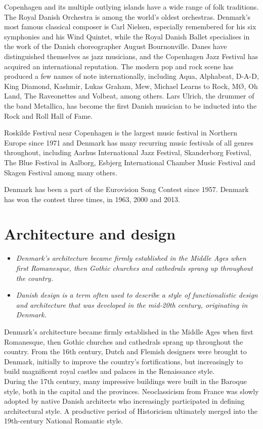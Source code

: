 Copenhagen and its multiple outlying islands have a wide range of folk
traditions. The Royal Danish Orchestra is among the world's oldest
orchestras. Denmark's most famous classical composer is Carl Nielsen,
especially remembered for his six symphonies and his Wind Quintet, while
the Royal Danish Ballet specialises in the work of the Danish
choreographer August Bournonville. Danes have distinguished themselves
as jazz musicians, and the Copenhagen Jazz Festival has acquired an
international reputation. The modern pop and rock scene has produced a
few names of note internationally, including Aqua, Alphabeat, D-A-D,
King Diamond, Kashmir, Lukas Graham, Mew, Michael Learns to Rock, MØ, Oh
Land, The Raveonettes and Volbeat, among others. Lars Ulrich, the
drummer of the band Metallica, has become the first Danish musician to
be inducted into the Rock and Roll Hall of Fame.

Roskilde Festival near Copenhagen is the largest music festival in
Northern Europe since 1971 and Denmark has many recurring music
festivals of all genres throughout, including Aarhus International Jazz
Festival, Skanderborg Festival, The Blue Festival in Aalborg, Esbjerg
International Chamber Music Festival and Skagen Festival among many
others.

Denmark has been a part of the Eurovision Song Contest since 1957.
Denmark has won the contest three times, in 1963, 2000 and 2013.

\section{Architecture and design}\label{architecture-and-design}

\begin{itemize}
\item
  \emph{Denmark's architecture became firmly established in the Middle
  Ages when first Romanesque, then Gothic churches and cathedrals sprang
  up throughout the country.}
\item
  \emph{Danish design is a term often used to describe a style of
  functionalistic design and architecture that was developed in the
  mid-20th century, originating in Denmark.}
\end{itemize}

Denmark's architecture became firmly established in the Middle Ages when
first Romanesque, then Gothic churches and cathedrals sprang up
throughout the country. From the 16th century, Dutch and Flemish
designers were brought to Denmark, initially to improve the country's
fortifications, but increasingly to build magnificent royal castles and
palaces in the Renaissance style.\\
During the 17th century, many impressive buildings were built in the
Baroque style, both in the capital and the provinces. Neoclassicism from
France was slowly adopted by native Danish architects who increasingly
participated in defining architectural style. A productive period of
Historicism ultimately merged into the 19th-century National Romantic
style.

